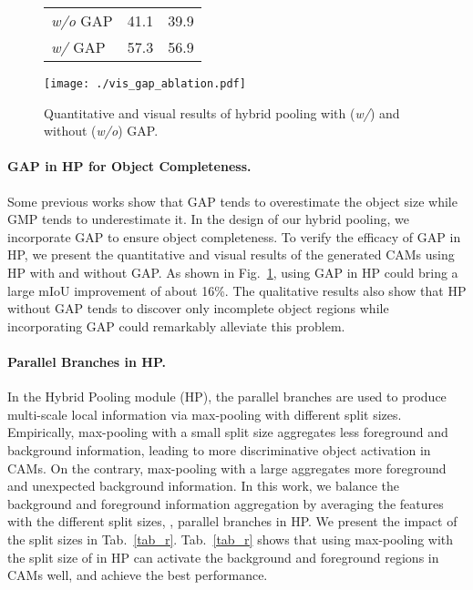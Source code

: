\begin{figure}[htp]

  \begin{minipage}{0.24\textwidth}
    \centering

    \begin{tabular}{l|cc}
      \toprule
                       &  &  \\ \midrule
      \textit{w/o} GAP & 41.1    & 39.9  \\
      \textit{w/} GAP  & 57.3    & 56.9  \\ \bottomrule
    \end{tabular}

  \end{minipage}
  \begin{minipage}{0.23\textwidth}
    \centering
    \texttt{[image: ./vis\_gap\_ablation.pdf]}
  \end{minipage}

  \caption{Quantitative and visual results of hybrid pooling with (\textit{w/}) and without (\textit{w/o}) GAP.}
  \label{fig_gap_ablation}
\end{figure}

\paragraph{\textbf{GAP in HP for Object Completeness.}}
\par Some previous works \citep{kolesnikov2016seed, zhou2016learning} show that GAP tends to overestimate the object size while GMP tends to underestimate it. In the design of our hybrid pooling, we incorporate GAP to ensure object completeness. To verify the efficacy of GAP in HP, we present the quantitative and visual results of the generated CAMs using HP with and without GAP. As shown in Fig.~\ref{fig_gap_ablation}, using GAP in HP could bring a large mIoU improvement of about 16\%. The qualitative results also show that HP without GAP tends to discover only incomplete object regions while incorporating GAP could remarkably alleviate this problem.

\paragraph{\textbf{Parallel Branches in HP.}}
\par In the Hybrid Pooling module (HP), the parallel branches are used to produce multi-scale local information via max-pooling with different split sizes. Empirically, max-pooling with a small split size  aggregates less foreground and background information, leading to more discriminative object activation in CAMs. On the contrary, max-pooling with a large  aggregates more foreground and unexpected background information. In this work, we balance the background and foreground information aggregation by averaging the features with the different split sizes, \ie, parallel branches in HP. We present the impact of the split sizes in Tab.~\ref{tab_r}. Tab.~\ref{tab_r} shows that using max-pooling with the split size of  in HP can activate the background and foreground regions in CAMs well, and achieve the best performance.

